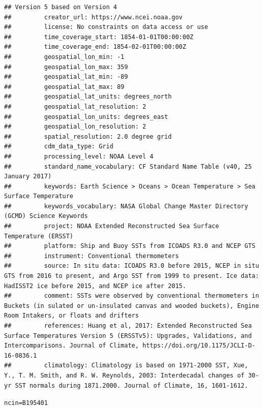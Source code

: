 \documentclass{article}\usepackage[]{graphicx}\usepackage[]{color}
\makeatletter
\newcommand{\hlstd}[1]{\textcolor[rgb]{0.345,0.345,0.345}{#1}}%
\newcommand{\hlkwb}[1]{\textcolor[rgb]{0.69,0.353,0.396}{#1}}%
\newenvironment{kframe}{%
 \def\at@end@of@kframe{}%
 \ifinner\ifhmode%
  \def\at@end@of@kframe{\end{minipage}}%
  \begin{minipage}{\columnwidth}%
 \fi\fi%
 \def\FrameCommand##1{\hskip\@totalleftmargin \hskip-\fboxsep
 \colorbox{shadecolor}{##1}\hskip-\fboxsep
     \hskip-\linewidth \hskip-\@totalleftmargin \hskip\columnwidth}%
 \MakeFramed {\advance\hsize-\width
   \@totalleftmargin\z@ \linewidth\hsize
   \@setminipage}}%
 {\par\unskip\endMakeFramed%
 \at@end@of@kframe}
\newenvironment{knitrout}{}{} %
\makeatother
\begin{document}
\begin{knitrout}
\begin{kframe}
\begin{verbatim}
## Version 5 based on Version 4
##         creator_url: https://www.ncei.noaa.gov
##         license: No constraints on data access or use
##         time_coverage_start: 1854-01-01T00:00:00Z
##         time_coverage_end: 1854-02-01T00:00:00Z
##         geospatial_lon_min: -1
##         geospatial_lon_max: 359
##         geospatial_lat_min: -89
##         geospatial_lat_max: 89
##         geospatial_lat_units: degrees_north
##         geospatial_lat_resolution: 2
##         geospatial_lon_units: degrees_east
##         geospatial_lon_resolution: 2
##         spatial_resolution: 2.0 degree grid
##         cdm_data_type: Grid
##         processing_level: NOAA Level 4
##         standard_name_vocabulary: CF Standard Name Table (v40, 25 January 2017)
##         keywords: Earth Science > Oceans > Ocean Temperature > Sea Surface Temperature
##         keywords_vocabulary: NASA Global Change Master Directory (GCMD) Science Keywords
##         project: NOAA Extended Reconstructed Sea Surface Temperature (ERSST)
##         platform: Ship and Buoy SSTs from ICOADS R3.0 and NCEP GTS
##         instrument: Conventional thermometers
##         source: In situ data: ICOADS R3.0 before 2015, NCEP in situ GTS from 2016 to present, and Argo SST from 1999 to present. Ice data: HadISST2 ice before 2015, and NCEP ice after 2015.
##         comment: SSTs were observed by conventional thermometers in Buckets (in sulated or un-insulated canvas and wooded buckets), Engine Room Intakers, or floats and drifters
##         references: Huang et al, 2017: Extended Reconstructed Sea Surface Temperatures Version 5 (ERSSTv5): Upgrades, Validations, and Intercomparisons. Journal of Climate, https://doi.org/10.1175/JCLI-D-16-0836.1
##         climatology: Climatology is based on 1971-2000 SST, Xue, Y., T. M. Smith, and R. W. Reynolds, 2003: Interdecadal changes of 30-yr SST normals during 1871.2000. Journal of Climate, 16, 1601-1612.
\end{verbatim}
\begin{alltt}
\hlstd{ncin} \hlkwb{=} \hlstd{B195401}


\end{alltt}
\end{kframe}
\end{knitrout}
\end{document}
